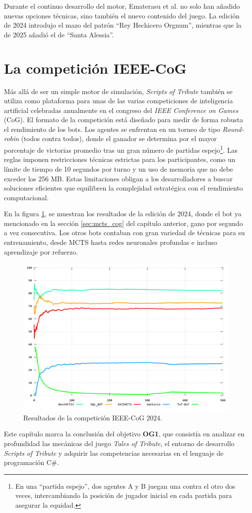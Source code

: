 Durante el continuo desarrollo del motor, Ematerasu et al. no solo han añadido nuevas opciones técnicas, sino también el nuevo contenido del juego. La edición de 2024 introdujo el mazo del patrón ``Rey Hechicero Orgnum'', mientras que la de 2025 añadió el de ``Santa Alessia''.

\section{La competición IEEE-CoG} \label{sec:competicion_ieee_cog}

Más allá de ser un simple motor de simulación, \textit{Scripts of Tribute} también se utiliza como plataforma para unas de las varias competiciones de inteligencia artificial celebradas anualmente en el congreso del \textit{IEEE Conference on Games} (CoG). El formato de la competición está diseñado para medir de forma robusta el rendimiento de los bots. Los agentes se enfrentan en un torneo de tipo \textit{Round-robin} (todos contra todos), donde el ganador se determina por el mayor porcentaje de victorias promedio tras un gran número de partidas espejo\footnote{En una ``partida espejo'', dos agentes A y B juegan una contra el otro dos veces, intercambiando la posición de jugador inicial en cada partida para asegurar la equidad.}. Las reglas imponen restricciones técnicas estrictas para los participantes, como un límite de tiempo de 10 segundos por turno y un uso de memoria que no debe exceder los 256 MB. Estas limitaciones obligan a los desarrolladores a buscar soluciones eficientes que equilibren la complejidad estratégica con el rendimiento computacional.

En la figura \ref{fig:competicion_ieee_cog_2024}, se muestran los resultados de la edición de 2024, donde el bot ya mencionado en la sección \ref{sec:mcts_cog} del capítulo anterior, gano por segundo a vez consecutiva. Los otros bots contaban con gran variedad de técnicas para su entrenamiento, desde MCTS hasta redes neuronales profundas e incluso aprendizaje por refuerzo.

\begin{figure}[H]
	\centering
	\includegraphics[width=1.0\textwidth]{img/ieee-cog-2024.png}
	\caption{Resultados de la competición IEEE-CoG 2024. \cite{ematerasu_scriptsoftribute-competitionsarchive_2024}}
	\label{fig:competicion_ieee_cog_2024}
\end{figure}

Este capítulo marca la conclusión del objetivo \textbf{OG1}, que consistía en analizar en profundidad las mecánicas del juego \textit{Tales of Tribute}, el entorno de desarrollo \textit{Scripts of Tribute} y adquirir las competencias necesarias en el lenguaje de programación C\#.